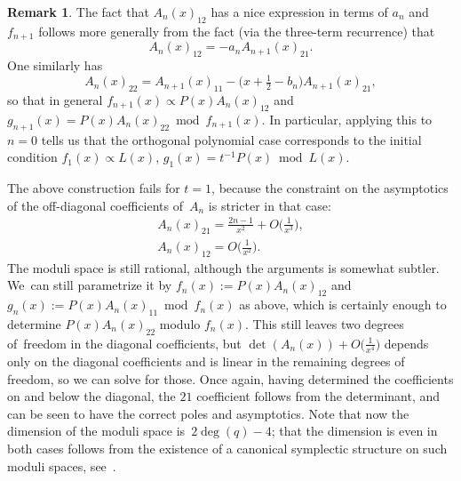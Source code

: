 \documentclass[10pt,a4paper]{amsart}
\theoremstyle{definition}
\newtheorem{Remark}[Theorem]{Remark}
\numberwithin{equation}{section}
\begin{document}
\begin{Remark}
 The fact that $A_n(x)_{12}$ has a nice expression in terms of $a_n$ and
 $f_{n+1}$ follows more generally from the fact (via the three-term
 recurrence) that
 \[
 A_n(x)_{12} = -a_n A_{n+1}(x)_{21}.
 \]
 One similarly has
 \[
 A_n(x)_{22} = A_{n+1}(x)_{11} - \big(x+\tfrac{1}{2}-b_n\big) A_{n+1}(x)_{21},
 \]
 so that in general $f_{n+1}(x)\propto P(x)A_n(x)_{12}$ and $g_{n+1}(x) =
 P(x)A_n(x)_{22}\bmod f_{n+1}(x)$.
 In particular, applying this to $n=0$ tells us that the orthogonal polynomial case corresponds to the initial condition $f_1(x)\propto L(x)$, $g_1(x)=t^{-1}P(x)\bmod L(x)$.
\end{Remark}

The above construction fails for $t=1$, because the constraint on the
asymptotics of the off-diagonal coefficients of~$A_n$ is stricter in that
case:
\begin{gather*}
A_n(x)_{21}= \tfrac{2n-1}{x^2} + O\big(\tfrac{1}{x^3}\big),
\\
A_n(x)_{12} = O\big(\tfrac{1}{x^2}\big).
\end{gather*}
The moduli space is still rational, although the arguments is somewhat
subtler. We~can still parametrize it by $f_n(x):=P(x)A_n(x)_{12}$ and
$g_n(x):=P(x)A_n(x)_{11}\bmod f_n(x)$ as above, which is certainly enough
to determine $P(x)A_n(x)_{22}$ modulo $f_n(x)$. This still leaves two
degrees of~freedom in the diagonal coefficients, but
$\det(A_n(x))+O\big(\tfrac{1}{x^4}\big)$ depends only on the diagonal coefficients and is
linear in the remaining degrees of freedom, so we can solve for those.
Once again, having determined the coefficients on and below the diagonal,
the $21$ coefficient follows from the determinant, and can be seen to have
the correct poles and asymptotics. Note that now the dimension of the
moduli space is~$2\deg(q)-4$; that the dimension is even in both cases
follows from the existence of a canonical symplectic structure on such
moduli spaces, see~\cite{Ra}.
\end{document}
